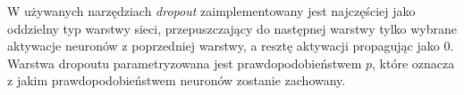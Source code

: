 W używanych narzędziach \textit{dropout} zaimplementowany jest najczęściej jako oddzielny typ warstwy sieci, przepuszczający do następnej warstwy tylko wybrane aktywacje neuronów z poprzedniej warstwy, a resztę aktywacji propagując jako 0. Warstwa dropoutu parametryzowana jest prawdopodobieństwem $p$, które oznacza z jakim prawdopodobieństwem neuronów zostanie zachowany.
